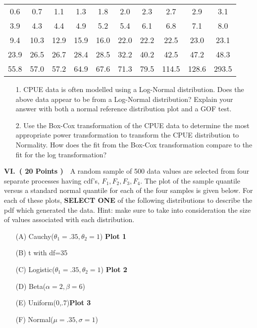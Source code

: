 \documentclass[10pt]{report}
\def\be{\begin{enumerate}}
\def\ee{\end{enumerate}}
\def\vvn{\vskip2mm\noindent}
\begin{document}
\begin{enumerate}
\begin{center}
\begin{tabular}{|cccccccccc|}\hline
0.6 &  0.7 & 1.1  &  1.3 & 1.8  &  2.0 &  2.3 &  2.7 &  2.9 &  3.1\\
3.9 & 4.3  & 4.4  & 4.9  &  5.2 &  5.4 & 6.1  &  6.8 &  7.1 &  8.0\\
9.4 &10.3  & 12.9 & 15.9 &  16.0& 22.0 & 22.2 &22.5  &  23.0& 23.1\\
23.9&26.5  & 26.7 & 28.4 & 28.5 & 32.2 &  40.2&42.5  &  47.2& 48.3\\
55.8&57.0& 57.2 & 64.9 &  67.6& 71.3 & 79.5 & 114.5& 128.6&293.5 \\
  \hline
\end{tabular}
\end{center}
\vvn
\be
\item[1.] CPUE data is often modelled using a Log-Normal distribution. Does the above data appear to be from a Log-Normal distribution? Explain your answer with both
a normal reference distribution plot and a GOF test.
\item[2.] Use the Box-Cox transformation of the CPUE data to
  determine the most appropriate power transformation to transform
  the CPUE distribution to Normality. How does the fit from the Box-Cox transformation compare to the fit for the log transformation?
\ee
\vfill\newpage
\vvn\vvn
{\bf VI.\ ( 20 Points )}\ \  A random sample of 500 data values are selected from
four separate processes having cdf's, $F_1, F_2, F_3, F_4$. The plot of the
sample quantile versus a standard normal quantile for each of the four samples
is given below. For each of these plots,
{\bf SELECT ONE} of the following
distributions to
describe the pdf which generated the data. Hint: make sure to take into consideration
the size of values associated with each distribution.
\vskip4mm
\noindent
\small
\begin{enumerate}
\item[(A)] Cauchy($\theta_1=.35,\theta_2=1$) \hskip2.52in  {\bf \large Plot 1
  \underbar { \  \  \  \  \  \  \ \  \  \  \  \  \  \ }}
\item[(B)] t with df=35
\item[(C)] Logistic($\theta_1=.35,\theta_2=1$)\hskip2.54in  {\bf \large Plot 2
  \underbar { \  \  \  \  \  \  \ \  \  \  \  \  \  \ }}
\item[(D)] Beta($\alpha=2,\beta=6$)
\item[(E)] Uniform(0,.7)\hskip3.14in{\bf \large Plot 3 \underbar { \  \  \
    \  \  \  \ \  \  \  \  \  \  \ }}
\item[(F)] Normal($\mu=.35,\sigma=1$)

\end{enumerate}
\end{enumerate}
\end{document}
